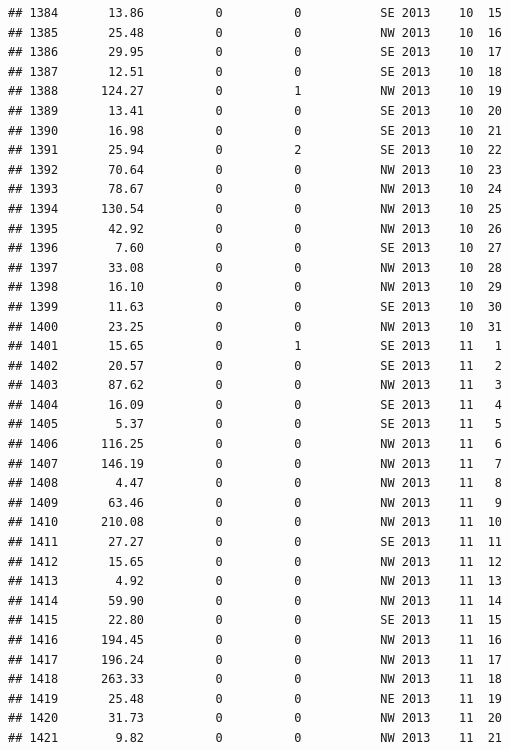 \documentclass[
]{article}
\begin{document}
\begin{verbatim}
## 1384       13.86          0          0           SE 2013    10  15
## 1385       25.48          0          0           NW 2013    10  16
## 1386       29.95          0          0           SE 2013    10  17
## 1387       12.51          0          0           SE 2013    10  18
## 1388      124.27          0          1           NW 2013    10  19
## 1389       13.41          0          0           SE 2013    10  20
## 1390       16.98          0          0           SE 2013    10  21
## 1391       25.94          0          2           SE 2013    10  22
## 1392       70.64          0          0           NW 2013    10  23
## 1393       78.67          0          0           NW 2013    10  24
## 1394      130.54          0          0           NW 2013    10  25
## 1395       42.92          0          0           NW 2013    10  26
## 1396        7.60          0          0           SE 2013    10  27
## 1397       33.08          0          0           NW 2013    10  28
## 1398       16.10          0          0           NW 2013    10  29
## 1399       11.63          0          0           SE 2013    10  30
## 1400       23.25          0          0           NW 2013    10  31
## 1401       15.65          0          1           SE 2013    11   1
## 1402       20.57          0          0           SE 2013    11   2
## 1403       87.62          0          0           NW 2013    11   3
## 1404       16.09          0          0           SE 2013    11   4
## 1405        5.37          0          0           SE 2013    11   5
## 1406      116.25          0          0           NW 2013    11   6
## 1407      146.19          0          0           NW 2013    11   7
## 1408        4.47          0          0           NW 2013    11   8
## 1409       63.46          0          0           NW 2013    11   9
## 1410      210.08          0          0           NW 2013    11  10
## 1411       27.27          0          0           SE 2013    11  11
## 1412       15.65          0          0           NW 2013    11  12
## 1413        4.92          0          0           NW 2013    11  13
## 1414       59.90          0          0           NW 2013    11  14
## 1415       22.80          0          0           SE 2013    11  15
## 1416      194.45          0          0           NW 2013    11  16
## 1417      196.24          0          0           NW 2013    11  17
## 1418      263.33          0          0           NW 2013    11  18
## 1419       25.48          0          0           NE 2013    11  19
## 1420       31.73          0          0           NW 2013    11  20
## 1421        9.82          0          0           NW 2013    11  21

\end{verbatim}
\end{document}
